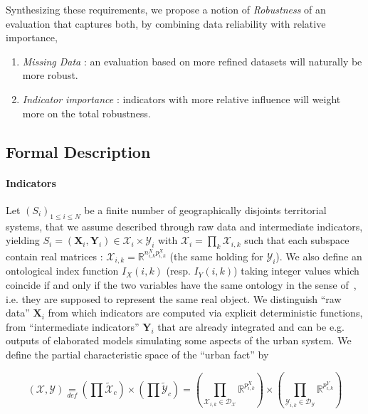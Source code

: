 \documentclass[runningheads,a4paper]{llncs2e/llncs}
\begin{document}
Synthesizing these requirements, we propose a notion of \emph{Robustness} of an evaluation that captures both, by combining data reliability with relative importance,
\begin{enumerate}
\item \emph{Missing Data} : an evaluation based on more refined datasets will naturally be more robust.
\item \emph{Indicator importance} : indicators with more relative influence will weight more on the total robustness.
\end{enumerate}



\subsection{Formal Description}


\paragraph{Indicators}

Let $(S_{i})_{1\leq i\leq N}$ be a finite number of geographically disjoints territorial systems, that we assume described through raw data and intermediate indicators, yielding $S_{i}=(\mathbf{X}_{i},\mathbf{Y}_{i})\in\mathcal{X}_{i}\times\mathcal{Y}_{i}$ with $\mathcal{X}_{i}=\prod_{k}\mathcal{X}_{i,k}$ such that each subspace contain real matrices : $\mathcal{X}_{i,k}=\mathbb{R}^{n_{i,k}^{X}p_{i,k}^{X}}$ (the same holding for $\mathcal{Y}_{i}$). We also define an ontological index function $I_{X}(i,k)$ (resp. $I_{Y}(i,k)$) taking integer values which coincide if and only if the two variables have the same ontology in the sense of~\cite{livet2010}, i.e. they are supposed to represent the same real object. We distinguish ``raw data'' $\mathbf{X}_{i}$ from which indicators are computed via explicit deterministic functions, from ``intermediate indicators'' $\mathbf{Y}_{i}$ that are already integrated and can be e.g. outputs of elaborated models simulating some aspects of the urban system. We define the partial characteristic space of the ``urban fact'' by 

\begin{equation}
(\mathcal{X},\mathcal{Y}) \underset{def}{=} \left(\prod\tilde{\mathcal{X}}_{c}\right)\times\left(\prod\tilde{\mathcal{Y}}_{c}\right) = \left(\prod_{\mathcal{X}_{i,k}\in\mathcal{D}_{\mathcal{X}}}\mathbb{R}^{p_{i,k}^{X}}\right)\times\left(\prod_{\mathcal{Y}_{i,k}\in\mathcal{D}_{\mathcal{Y}}}\mathbb{R}^{p_{i,k}^{Y}}\right)
\end{equation}
\end{document}
